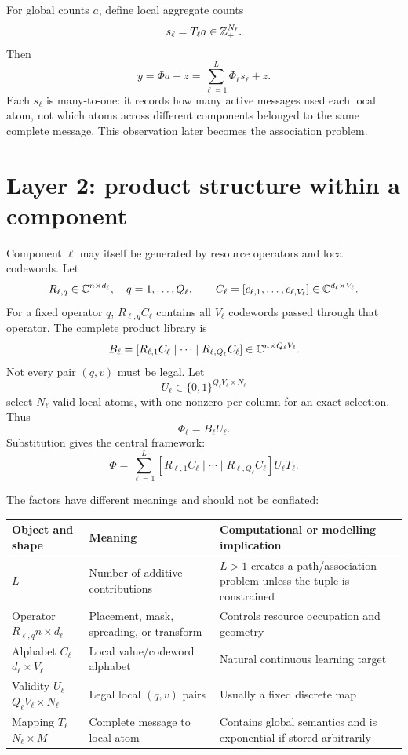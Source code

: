 \documentclass[11pt]{article}
\begin{document}
For global counts $a$, define local aggregate counts
\[
 s_\ell=T_\ell a\in\mathbb{Z}_+^{N_\ell}.
\]
Then
\[
 y=\Phi a+z=\sum_{\ell=1}^L\Phi_\ell s_\ell+z.
\]
Each $s_\ell$ is many-to-one: it records how many active messages used each local atom, not which atoms across different
components belonged to the same complete message. This observation later becomes the association problem.

\section{Layer 2: product structure within a component}

Component $\ell$ may itself be generated by resource operators and local codewords. Let
\[
 R_{\ell,q}\in\mathbb{C}^{n\times d_\ell},\quad q=1,\ldots,Q_\ell,
 \qquad
 C_\ell=[c_{\ell,1},\ldots,c_{\ell,V_\ell}]\in\mathbb{C}^{d_\ell\times V_\ell}.
\]
For a fixed operator $q$, $R_{\ell,q}C_\ell$ contains all $V_\ell$ codewords passed through that operator. The complete
product library is
\[
 B_\ell=[R_{\ell,1}C_\ell\mid\cdots\mid R_{\ell,Q_\ell}C_\ell]
 \in\mathbb{C}^{n\times Q_\ell V_\ell}.
\]
Not every pair $(q,v)$ must be legal. Let
\[
 U_\ell\in\{0,1\}^{Q_\ell V_\ell\times N_\ell}
\]
select $N_\ell$ valid local atoms, with one nonzero per column for an exact selection. Thus
\[
 \Phi_\ell=B_\ell U_\ell.
\]
Substitution gives the central framework:
\[
 \boxed{
 \Phi=\sum_{\ell=1}^L
 [R_{\ell,1}C_\ell\mid\cdots\mid R_{\ell,Q_\ell}C_\ell]U_\ell T_\ell.}
\]

The factors have different meanings and should not be conflated:
\begin{center}
\small
\begin{tabularx}{\textwidth}{@{}p{}YY@{}}
\toprule
Object and shape & Meaning & Computational or modelling implication \\
\midrule
$L$ & Number of additive contributions & $L>1$ creates a path/association problem unless the tuple is constrained \\
Operator $R_{\ell,q}$\newline $n\times d_\ell$ & Placement, mask, spreading, or transform & Controls resource occupation and geometry \\
Alphabet $C_\ell$\newline $d_\ell\times V_\ell$ & Local value/codeword alphabet & Natural continuous learning target \\
Validity $U_\ell$\newline $Q_\ell V_\ell\times N_\ell$ & Legal local $(q,v)$ pairs & Usually a fixed discrete map \\
Mapping $T_\ell$\newline $N_\ell\times M$ & Complete message to local atom & Contains global semantics and is exponential if stored arbitrarily \\
\bottomrule
\end{tabularx}
\end{center}
\end{document}
